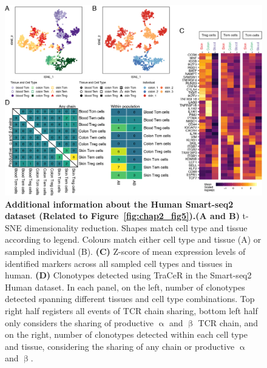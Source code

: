 \begin{figure}[hpt!]
\end{figure}

\begin{figure}[pt!] 
\centering    
\includegraphics[width=1.0\textwidth]{Appendix1/Figs/appA_fig6.png} %
\caption[Additional information about the Human Smart-seq2 dataset]{\textbf{Additional information about the Human Smart-seq2 dataset (Related to Figure~\ref{fig:chap2_fig5}).}\newline\textbf{(A and B)} t-SNE dimensionality reduction. Shapes match cell type and tissue according to legend. Colours match either cell type and tissue (A) or sampled individual (B). \textbf{(C)} Z-score of mean expression levels of identified markers across all sampled cell types and tissues in human. \textbf{(D)} Clonotypes detected using TraCeR in the Smart-seq2 Human dataset. In each panel, on the left, number of clonotypes detected spanning different tissues and cell type combinations. Top right half registers all events of TCR chain sharing, bottom left half only considers the sharing of productive ${\upalpha}$ and ${\upbeta}$ TCR chain, and on the right, number of clonotypes detected within each cell type and tissue, considering the sharing of any chain or productive ${\upalpha}$ and ${\upbeta}$.}
\label{fig:appA_fig6}
\end{figure}


